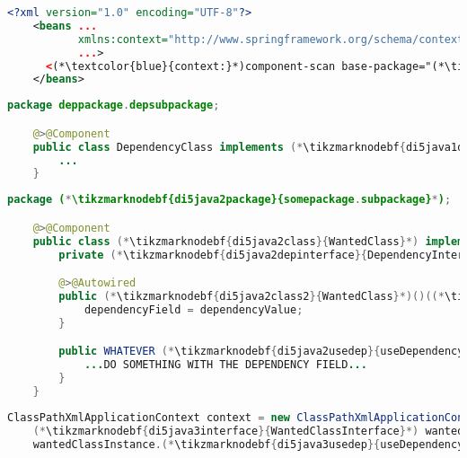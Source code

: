 \label{constructorinjectionautowire}
\begin{lstlisting}[language=XML, title={Configuration XML}]
    <?xml version="1.0" encoding="UTF-8"?>
    <beans ...
           xmlns:context="http://www.springframework.org/schema/context"
           ...>
      <(*\textcolor{blue}{context:}*)component-scan base-package="(*\tikzmarknodebf{di5xml1package}{somepackage.subpackage}[ForestGreen]*)"/>
    </beans>
\end{lstlisting}
\begin{lstlisting}[language=Java, title={Dependency class}]
    package deppackage.depsubpackage;

    @>@Component
    public class DependencyClass implements (*\tikzmarknodebf{di5java1depinterface}{DependencyInterface}*) {
        ...
    }
\end{lstlisting}
\begin{lstlisting}[language=Java, title={Wanted class with the constructor}]
    package (*\tikzmarknodebf{di5java2package}{somepackage.subpackage}*);

    @>@Component
    public class (*\tikzmarknodebf{di5java2class}{WantedClass}*) implements (*\tikzmarknodebf{di5java2interface}{WantedClassInterface}*) {
        private (*\tikzmarknodebf{di5java2depinterface}{DependencyInterface}*) dependencyField;

        @>@Autowired
        public (*\tikzmarknodebf{di5java2class2}{WantedClass}*)()((*\tikzmarknodebf{di5java2depinterface2}{DependencyInterface}*) dependencyValue) {
            dependencyField = dependencyValue;
        }

        public WHATEVER (*\tikzmarknodebf{di5java2usedep}{useDependency}*)() {
            ...DO SOMETHING WITH THE DEPENDENCY FIELD...
        }
    }
\end{lstlisting}
\begin{lstlisting}[language=Java, title={Usage}]
    ClassPathXmlApplicationContext context = new ClassPathXmlApplicationContext("configurationFile.xml");
    (*\tikzmarknodebf{di5java3interface}{WantedClassInterface}*) wantedClassInstance = context.getBean("(*\tikzmarknodebf{di5java3beanid}{wantedClass}[ForestGreen]*)", (*\tikzmarknodebf{di5java3interface2}{WantedClassInterface}*).class);
    wantedClassInstance.(*\tikzmarknodebf{di5java3usedep}{useDependency}*)();
\end{lstlisting}
\newpage

